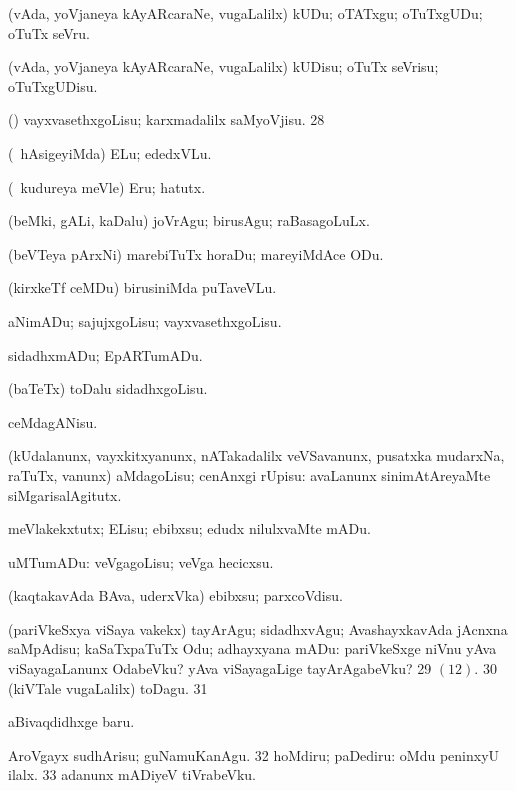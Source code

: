 {{ (vAda, yoVjaneya kAyARcaraNe, \mo vugaLalilx) kUDu; oTATxgu; oTuTxgUDu;
oTuTx seVru. 

 (vAda, yoVjaneya kAyARcaraNe, \mo vugaLalilx) kUDisu; oTuTx seVrisu; oTuTxgUDisu. 

 (\ashi) vayxvasethxgoLisu; karxmadalilx saMyoVjisu. 
\num{28}  

 (\kanmu\ hAsigeyiMda) ELu; ededxVLu.

 (\kanmu\ kudureya meVle) Eru; hatutx. 

 (beMki, gALi, kaDalu) joVrAgu; birusAgu; raBasagoLuLx. 

 (beVTeya pArxNi) marebiTuTx horaDu;
mareyiMdAce ODu. 

 (kirxkeTf ceMDu) birusiniMda puTaveVLu. 

 aNimADu; sajujxgoLisu; vayxvasethxgoLisu. 

 sidadhxmADu; EpARTumADu.

 (baTeTx) toDalu sidadhxgoLisu. 

 ceMdagANisu. 

 (kUdalanunx, vayxkitxyanunx, nATakadalilx veVSavanunx, pusatxka mudarxNa, raTuTx, \mo vanunx) aMdagoLisu; cenAnxgi rUpisu:  avaLanunx sinimAtAreyaMte siMgarisalAgitutx. 

 meVlakekxtutx; ELisu; ebibxsu; edudx nilulxvaMte mADu. 

 uMTumADu:  veVgagoLisu; veVga hecicxsu. 

 (kaqtakavAda BAva, uderxVka) ebibxsu; parxcoVdisu. 

 (pariVkeSxya viSaya \mo vakekx) tayArAgu; sidadhxvAgu;
AvashayxkavAda 
jAcnxna saMpAdisu;  kaSaTxpaTuTx Odu; adhayxyana mADu:  pariVkeSxge niVnu yAva viSayagaLanunx OdabeVku?
yAva viSayagaLige tayArAgabeVku? 
\num{29}  \hyperlink{get pagu12}{\pagu $(12)$}. 
\num{30}  (kiVTale \mo vugaLalilx) toDagu. 
\num{31}  

 aBivaqdidhxge baru. 

 AroVgayx sudhArisu; guNamuKanAgu. 
\num{32}  hoMdiru; paDediru:  oMdu peninxyU ilalx. 
\num{33}  adanunx mADiyeV tiVrabeVku.}}

